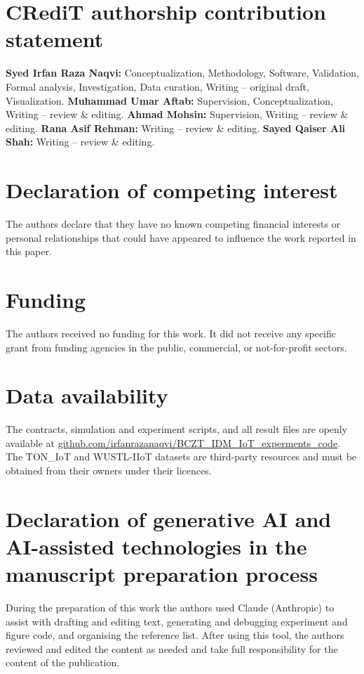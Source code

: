 \newcommand{\confirm}{\textcolor{red}{[AUTHORS TO CONFIRM]}}
\section*{CRediT authorship contribution statement}
\textbf{Syed Irfan Raza Naqvi:} Conceptualization, Methodology, Software, Validation, Formal analysis, Investigation, Data curation, Writing -- original draft, Visualization.
\textbf{Muhammad Umar Aftab:} Supervision, Conceptualization, Writing -- review \& editing.
\textbf{Ahmad Mohsin:} Supervision, Writing -- review \& editing.
\textbf{Rana Asif Rehman:} Writing -- review \& editing.
\textbf{Sayed Qaiser Ali Shah:} Writing -- review \& editing.

\section*{Declaration of competing interest}
The authors declare that they have no known competing financial interests or personal relationships that could have appeared to influence the work reported in this paper.

\section*{Funding}
The authors received no funding for this work. It did not receive any specific grant from funding agencies in the public, commercial, or not-for-profit sectors.

\section*{Data availability}
The contracts, simulation and experiment scripts, and all result files are openly available at \href{https://github.com/irfanrazanaqvi/BCZT_IDM_IoT_experments_code}{github.com/irfanrazanaqvi/BCZT\_IDM\_IoT\_experments\_code}. The TON\_IoT and WUSTL-IIoT datasets are third-party resources and must be obtained from their owners under their licences.

\section*{Declaration of generative AI and AI-assisted technologies in the manuscript preparation process}
During the preparation of this work the authors used Claude (Anthropic) to assist with drafting and editing text, generating and debugging experiment and figure code, and organising the reference list. After using this tool, the authors reviewed and edited the content as needed and take full responsibility for the content of the publication.

